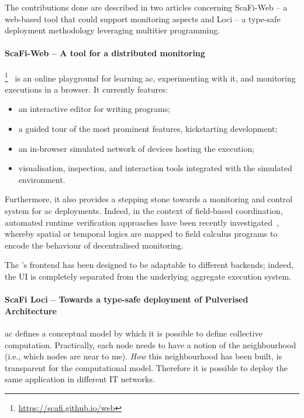 \documentclass[11pt]{article}
\begin{document}
The contributions done are described in two articles concerning ScaFi-Web -- a web-based tool that could support monitoring aspects and \scafi Loci -- a type-safe deployment methodology leveraging multitier programming.
\paragraph{ScaFi-Web -- A tool for a distributed monitoring} \label{scafi-web}
\scafiweb{}\footnote{\url{https://scafi.github.io/web}}~\cite{DBLP:conf/coordination/AguzziCMPV21}
 is an online playground for learning \ac{ac}, experimenting with it, and monitoring executions in a browser.
It currently features:
\begin{itemize}
 \item an interactive editor for writing \scafi{} programs;
 \item a guided tour of the most prominent features, kickstarting development;
 \item an in-browser simulated network of devices hosting the execution;
 \item visualisation, inspection, and interaction tools integrated with the simulated environment.
\end{itemize}

Furthermore, it also provides a stepping stone towards a monitoring and control system for \ac{ac} deployments.
Indeed, in the context of field-based coordination, automated runtime verification approaches have been recently investigated~\cite{DBLP:journals/jss/AudritoCDSV21}, whereby spatial or temporal logics are mapped to field calculus programs to encode the behaviour of decentralised monitoring.

The \scafiweb{}'s frontend has been designed to be adaptable to different backends; indeed, the UI is completely separated from the underlying aggregate execution system. 

\paragraph{ScaFi Loci -- Towards a type-safe deployment of Pulverised Architecture}
\ac{ac} defines a conceptual model by which it is possible to define collective computation. Practically, each node needs to have a notion of the neighbourhood (i.e., which nodes are near to me). \textit{How} this neighbourhood has been built, is transparent for the computational model. Therefore it is possible to deploy the same application in different IT networks.
\end{document}
